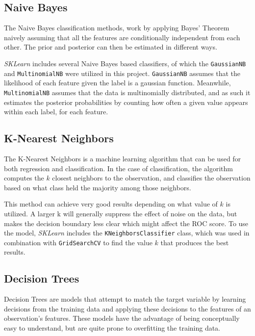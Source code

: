 \documentclass{IEEEtran}
\begin{document}
\subsection{Naive Bayes}

The Naive Bayes classification methods, work by applying Bayes' Theorem naively assuming that all the features are conditionally independent from each other. The prior and posterior can then be estimated in different ways.

\textit{SKLearn} includes several Naive Bayes based classifiers, of which the \texttt{GaussianNB} and \texttt{MultinomialNB} were utilized in this project. \texttt{GaussianNB} assumes that the likelihood of each feature given the label is a gaussian function. Meanwhile, \texttt{MultinomialNB} assumes that the data is multinomially distributed, and as such it estimates the posterior probabilities by counting how often a given value appears within each label, for each feature. 

\subsection{K-Nearest Neighbors}

The K-Nearest Neighbors is a machine learning algorithm that can be used for both regression and classification. In the case of classification, the algorithm computes the $k$ closest neighbors to the observation, and classifies the observation based on what class held the majority among those neighbors.

This method can achieve very good results depending on what value of $k$ is utilized. A larger k will generally suppress the effect of noise on the data, but makes the decision boundary less clear which might affect the ROC score. To use the model, \textit{SKLearn} includes the \texttt{KNeighborsClassifier} class, which was used in combination with \texttt{GridSearchCV} to find the value $k$ that produces the best results.

\subsection{Decision Trees}

Decision Trees are models that attempt to match the target variable by learning decisions from the training data and applying these decisions to the features of an observation's features. These models have the advantage of being conceptually easy to understand, but are quite prone to overfitting the training data.
\end{document}
